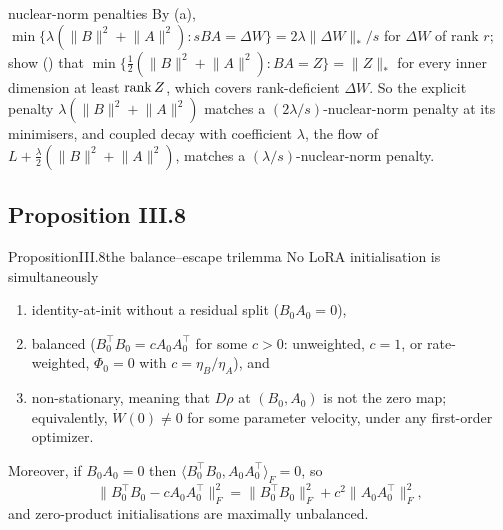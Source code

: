 \begin{remark*}{nuclear-norm penalties}
By (a), $\min\{\lambda(\lVert B\rVert^2+\lVert A\rVert^2):sBA=\Delta W\}=2\lambda\lVert\Delta W\rVert_*/s$ for $\Delta W$ of
rank $r$; \citet{xsrebro2004maximum} show () that $\min\{\tfrac12(\lVert B\rVert^2+\lVert A\rVert^2):BA=Z\}=\lVert Z\rVert_*$
for every inner dimension at least $\operatorname{rank} Z$, which covers rank-deficient $\Delta W$. So the explicit penalty
$\lambda(\lVert B\rVert^2+\lVert A\rVert^2)$ matches a $(2\lambda/s)$-nuclear-norm penalty at its minimisers, and coupled
decay with coefficient $\lambda$, the flow of $L+\tfrac\lambda2(\lVert B\rVert^2+\lVert A\rVert^2)$, matches a
$(\lambda/s)$-nuclear-norm penalty.
\end{remark*}

\subsection{Proposition III.8}\label{proof:III.8}

\begin{restate}{Proposition}{III.8}{the balance--escape trilemma}
No LoRA initialisation is simultaneously
\begin{enumerate}[label=(\alph*)]
\item identity-at-init without a residual split ($B_0A_0=0$),
\item balanced ($B_0^\top B_0=cA_0A_0^\top$ for some $c>0$: unweighted, $c=1$, or rate-weighted, $\Phi_0=0$ with
$c=\eta_B/\eta_A$), and
\item non-stationary, meaning that $D\rho$ at $(B_0,A_0)$ is not the zero map; equivalently, $\dot W(0)\ne0$ for some
parameter velocity, under any first-order optimizer.
\end{enumerate}
Moreover, if $B_0A_0=0$ then $\langle B_0^\top B_0,A_0A_0^\top\rangle_F=0$, so
\[\lVert B_0^\top B_0-cA_0A_0^\top\rVert_F^2=\lVert B_0^\top B_0\rVert_F^2+c^2\lVert A_0A_0^\top\rVert_F^2,\]
and zero-product initialisations are maximally unbalanced.
\end{restate}

